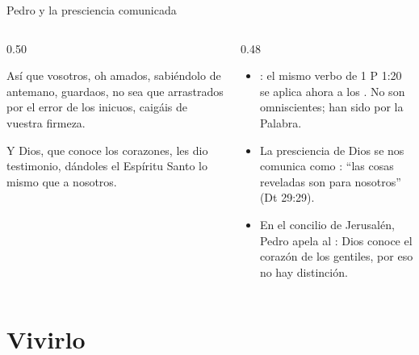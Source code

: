 \begin{frame}{Pedro y la presciencia comunicada}
\begin{columns}[t,onlytextwidth]
\begin{column}{0.50\textwidth}
\begin{cita}Así que vosotros, oh amados, sabiéndolo de antemano, guardaos, no sea que arrastrados por el error de los inicuos, caigáis de vuestra firmeza.\end{cita}
\begin{cita}Y Dios, que conoce los corazones, les dio testimonio, dándoles el Espíritu Santo lo mismo que a nosotros.\end{cita}
\end{column}
\begin{column}{0.48\textwidth}\small
\begin{itemize}
\item {}: el mismo verbo de 1 P 1:20 se aplica ahora a los . No son omniscientes; han sido  por la Palabra.
\item La presciencia de Dios se nos comunica como : ``las cosas reveladas son para nosotros'' (Dt 29:29).
\item En el concilio de Jerusalén, Pedro apela al : Dios conoce el corazón de los gentiles, por eso no hay distinción.
\end{itemize}
\end{column}
\end{columns}
\end{frame}

\section{Vivirlo}

